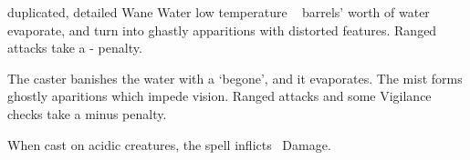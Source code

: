 
  {duplicated, detailed}%
  {Wane}%
  {Water}%
  {low temperature}%
  {\spellArea\  barrels' worth of water evaporate, and turn into ghastly apparitions with distorted features.  Ranged attacks take a - penalty.}%
  {
    The caster banishes the water with a `begone', and it evaporates.
    The mist forms ghostly aparitions which impede vision.
    Ranged attacks and some Vigilance checks take a minus  penalty.

  When cast on acidic creatures, the spell inflicts \rollConv\ Damage.
    }

